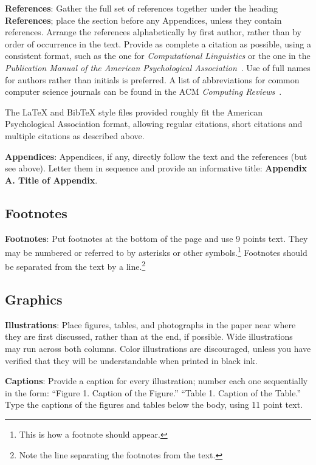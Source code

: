 \documentclass[11pt]{article}
\begin{document}
\textbf{References}: Gather the full set of references together under
the heading {\bf References}; place the section before any Appendices,
unless they contain references. Arrange the references alphabetically
by first author, rather than by order of occurrence in the text.
Provide as complete a citation as possible, using a consistent format,
such as the one for {\em Computational Linguistics\/} or the one in the
  {\em Publication Manual of the American
    Psychological Association\/}~\cite{APA:83}.  Use of full names for
authors rather than initials is preferred.  A list of abbreviations
for common computer science journals can be found in the ACM
  {\em Computing Reviews\/}~\cite{ACM:83}.

The \LaTeX{} and Bib\TeX{} style files provided roughly fit the
American Psychological Association format, allowing regular citations,
short citations and multiple citations as described above.

  {\bf Appendices}: Appendices, if any, directly follow the text and the
references (but see above).  Letter them in sequence and provide an
informative title: {\bf Appendix A. Title of Appendix}.

\subsection{Footnotes}

{\bf Footnotes}: Put footnotes at the bottom of the page and use 9
points text. They may be numbered or referred to by asterisks or other
symbols.\footnote{This is how a footnote should appear.} Footnotes
should be separated from the text by a line.\footnote{Note the line
  separating the footnotes from the text.}

\subsection{Graphics}

{\bf Illustrations}: Place figures, tables, and photographs in the
paper near where they are first discussed, rather than at the end, if
possible.  Wide illustrations may run across both columns.  Color
illustrations are discouraged, unless you have verified that
they will be understandable when printed in black ink.

  {\bf Captions}: Provide a caption for every illustration; number each one
sequentially in the form:  ``Figure 1. Caption of the Figure.'' ``Table 1.
Caption of the Table.''  Type the captions of the figures and
tables below the body, using 11 point text.
\end{document}
